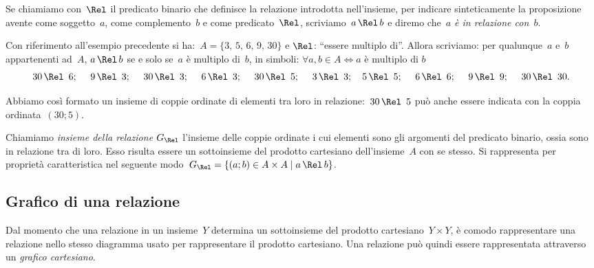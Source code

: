\ovalbox{\risolvi \ref{ese:7.2}}\vspazio

Se chiamiamo con~$\Rel$ il predicato binario che definisce la relazione introdotta nell'insieme, per indicare 
sinteticamente la proposizione avente come soggetto~$a$, come complemento~$b$ e come predicato~$\Rel$, scriviamo~$a \,\Rel\, b$ e
diremo che~\emph{$a$ è in relazione con~$b$}.

\begin{exrig}
 \begin{esempio}

Con riferimento all'esempio precedente si ha:~$A = \{3\text{,~}5\text{,~}6\text{,~}9\text{,~}30\}$ e $\Rel$:
``essere multiplo di''. Allora scriviamo: per qualunque~$a$ e~$b$ appartenenti ad~$A$,
$a \,\Rel\, b$ se e solo se~$a$ è multiplo di~$b$, in simboli: $\forall a,b \in A \Leftrightarrow a \text{ è multiplo di } b$
\[30 \,\Rel\,~6;\quad~9 \,\Rel\,~3;\quad~30 \,\Rel\,~3;\quad~6 \,\Rel\,~3;\quad~30 \,\Rel\,~5;\quad~3 \,\Rel\,~3;\quad 5 \,\Rel\,~5;\quad~6 \,\Rel\,~6;\quad~9 \,\Rel\,~9;\quad~30 \,\Rel\,~30.\]

Abbiamo così formato un insieme di coppie ordinate di elementi tra loro in relazione:~$30 \,\Rel\,~5$ può anche essere indicata con la coppia ordinata~$(30;5)$.
\end{esempio}
\end{exrig}

\begin{definizione}
Chiamiamo \emph{insieme della relazione} $G_\Rel$ l'insieme delle coppie ordinate i cui
elementi sono gli argomenti del predicato binario, ossia sono in relazione tra di loro. Esso risulta essere un
sottoinsieme del prodotto cartesiano dell'insieme~$A$ con se stesso. Si rappresenta per proprietà caratteristica nel
seguente modo~$G_\Rel = \{(a;b) \in A \times A \mid  a \,\Rel\, b \}$.
\end{definizione}

\ovalbox{\risolvii \ref{ese:7.3}, \ref{ese:7.4}, \ref{ese:7.5}, \ref{ese:7.6}}
\subsection{Grafico di una relazione}

Dal momento che una relazione in un insieme~$Y$ determina un sottoinsieme del prodotto cartesiano~$Y \times Y$, è
comodo rappresentare una relazione nello stesso diagramma usato per rappresentare il prodotto cartesiano.
Una relazione può quindi essere rappresentata attraverso un \emph{grafico cartesiano}.

